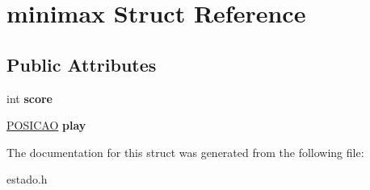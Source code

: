 \hypertarget{structminimax}{}\section{minimax Struct Reference}
\label{structminimax}
\subsection*{Public Attributes}
\begin{DoxyCompactItemize}
\item 
\mbox{\label{structminimax_aac1bc5745a4684a3b062ea660994ce19}} 
int {\bfseries score}
\item 
\mbox{\label{structminimax_a5c2cef3449a860f9b4c272281632bc31}} 
\mbox{\hyperlink{structposicao}{P\+O\+S\+I\+C\+AO}} {\bfseries play}
\end{DoxyCompactItemize}


The documentation for this struct was generated from the following file\+:\begin{DoxyCompactItemize}
\item 
estado.\+h\end{DoxyCompactItemize}
